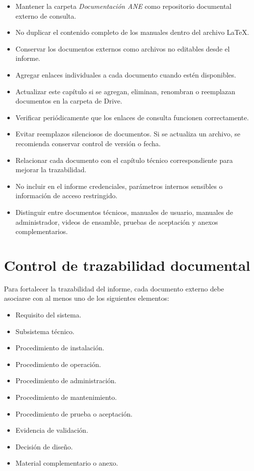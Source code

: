 \begin{itemize}
    \item Mantener la carpeta \textit{Documentación ANE} como repositorio documental externo de consulta.
    \item No duplicar el contenido completo de los manuales dentro del archivo \LaTeX.
    \item Conservar los documentos externos como archivos no editables desde el informe.
    \item Agregar enlaces individuales a cada documento cuando estén disponibles.
    \item Actualizar este capítulo si se agregan, eliminan, renombran o reemplazan documentos en la carpeta de Drive.
    \item Verificar periódicamente que los enlaces de consulta funcionen correctamente.
    \item Evitar reemplazos silenciosos de documentos. Si se actualiza un archivo, se recomienda conservar control de versión o fecha.
    \item Relacionar cada documento con el capítulo técnico correspondiente para mejorar la trazabilidad.
    \item No incluir en el informe credenciales, parámetros internos sensibles o información de acceso restringido.
    \item Distinguir entre documentos técnicos, manuales de usuario, manuales de administrador, videos de ensamble, pruebas de aceptación y anexos complementarios.
\end{itemize}

\section{Control de trazabilidad documental}

Para fortalecer la trazabilidad del informe, cada documento externo debe asociarse con al menos uno de los siguientes elementos:

\begin{itemize}
    \item Requisito del sistema.
    \item Subsistema técnico.
    \item Procedimiento de instalación.
    \item Procedimiento de operación.
    \item Procedimiento de administración.
    \item Procedimiento de mantenimiento.
    \item Procedimiento de prueba o aceptación.
    \item Evidencia de validación.
    \item Decisión de diseño.
    \item Material complementario o anexo.
\end{itemize}

